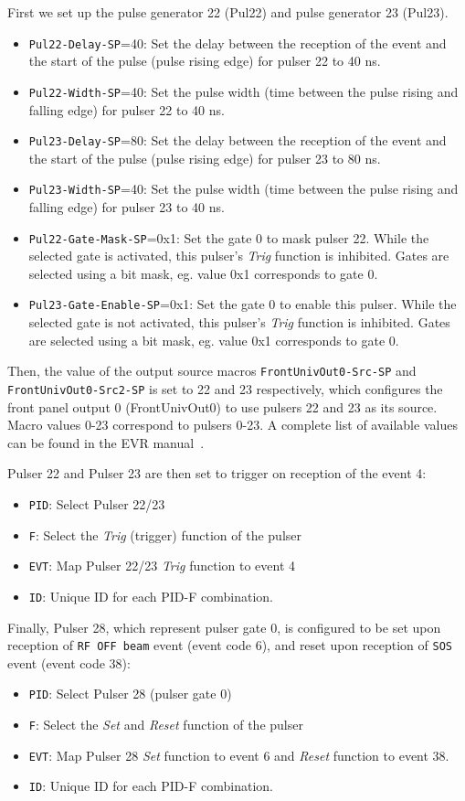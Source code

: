 \documentclass[12pt,a4paper]{article}
\begin{document}
First we set up the pulse generator 22 (Pul22) and  pulse generator 23 (Pul23).
\begin{itemize}
	\item \texttt{Pul22-Delay-SP}=40: Set the delay between the reception of the event and the start of the pulse (pulse rising edge) for pulser 22 to 40 ns. 
	\item \texttt{Pul22-Width-SP}=40: Set the pulse width (time between the pulse rising and falling edge) for pulser 22 to 40 ns.
	\item \texttt{Pul23-Delay-SP}=80: Set the delay between the reception of the event and the start of the pulse (pulse rising edge) for pulser 23 to 80 ns. 
	\item \texttt{Pul23-Width-SP}=40: Set the pulse width (time between the pulse rising and falling edge) for pulser 23 to 40 ns.
	\item \texttt{Pul22-Gate-Mask-SP}=0x1: Set the gate 0 to mask pulser 22. While the selected gate is activated, this pulser's \textit{Trig} function is inhibited. Gates are selected using a bit mask, eg. value 0x1 corresponds to gate 0.
	\item \texttt{Pul23-Gate-Enable-SP}=0x1: Set the gate 0 to enable this pulser. While the selected gate is not activated, this pulser's \textit{Trig} function is inhibited. Gates are selected using a bit mask, eg. value 0x1 corresponds to gate 0.
\end{itemize}

Then, the value of the output source macros \texttt{FrontUnivOut0-Src-SP} and \texttt{FrontUnivOut0-Src2-SP} is set to 22 and 23 respectively, which configures the front panel output 0 (FrontUnivOut0) to use pulsers 22 and 23 as its source. Macro values 0-23 correspond to pulsers 0-23. A complete list of available values can be found in the EVR manual~\cite{evr_manual}.

Pulser 22 and Pulser 23 are then set to trigger on reception of the event 4:
\begin{itemize}
	\item \texttt{PID}: Select Pulser 22/23
	\item \texttt{F}: Select the \textit{Trig} (trigger) function of the pulser
	\item \texttt{EVT}: Map Pulser 22/23 \textit{Trig} function to event 4
	\item \texttt{ID}: Unique ID for each PID-F combination.
\end{itemize}

Finally, Pulser 28, which represent pulser gate 0, is configured to be set upon reception of \texttt{RF OFF beam} event (event code 6), and reset upon reception of \texttt{SOS} event (event code 38):
\begin{itemize}
	\item \texttt{PID}: Select Pulser 28 (pulser gate 0)
	\item \texttt{F}: Select the \textit{Set} and \textit{Reset} function of the pulser
	\item \texttt{EVT}: Map Pulser 28 \textit{Set} function to event 6 and \textit{Reset} function to event 38.
	\item \texttt{ID}: Unique ID for each PID-F combination.
\end{itemize}
\end{document}

